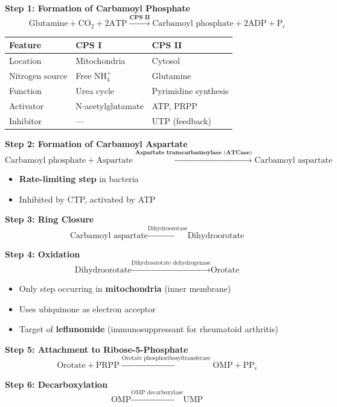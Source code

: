 \textbf{Step 1: Formation of Carbamoyl Phosphate}
\[
\text{Glutamine} + \text{CO}_2 + 2\text{ATP} \xrightarrow{\textbf{CPS II}} \text{Carbamoyl phosphate} + 2\text{ADP} + \text{P}_i
\]

\begin{center}
\begin{tabular}{lll}
\toprule
\textbf{Feature} & \textbf{CPS I} & \textbf{CPS II} \\
\midrule
Location & Mitochondria & Cytosol \\
Nitrogen source & Free NH$_4^+$ & Glutamine \\
Function & Urea cycle & Pyrimidine synthesis \\
Activator & N-acetylglutamate & ATP, PRPP \\
Inhibitor & — & UTP (feedback) \\
\bottomrule
\end{tabular}
\end{center}

\textbf{Step 2: Formation of Carbamoyl Aspartate}
\[
\text{Carbamoyl phosphate} + \text{Aspartate} \xrightarrow{\textbf{Aspartate transcarbamoylase (ATCase)}} \text{Carbamoyl aspartate}
\]
\begin{itemize}
    \item \textbf{Rate-limiting step} in bacteria
    \item Inhibited by CTP, activated by ATP
\end{itemize}

\textbf{Step 3: Ring Closure}
\[
\text{Carbamoyl aspartate} \xrightarrow{\text{Dihydroorotase}} \text{Dihydroorotate}
\]

\textbf{Step 4: Oxidation}
\[
\text{Dihydroorotate} \xrightarrow{\text{Dihydroorotate dehydrogenase}} \text{Orotate}
\]
\begin{itemize}
    \item Only step occurring in \textbf{mitochondria} (inner membrane)
    \item Uses ubiquinone as electron acceptor
    \item Target of \textbf{leflunomide} (immunosuppressant for rheumatoid arthritis)
\end{itemize}

\textbf{Step 5: Attachment to Ribose-5-Phosphate}
\[
\text{Orotate} + \text{PRPP} \xrightarrow{\text{Orotate phosphoribosyltransferase}} \text{OMP} + \text{PP}_i
\]

\textbf{Step 6: Decarboxylation}
\[
\text{OMP} \xrightarrow{\text{OMP decarboxylase}} \text{UMP}
\]

